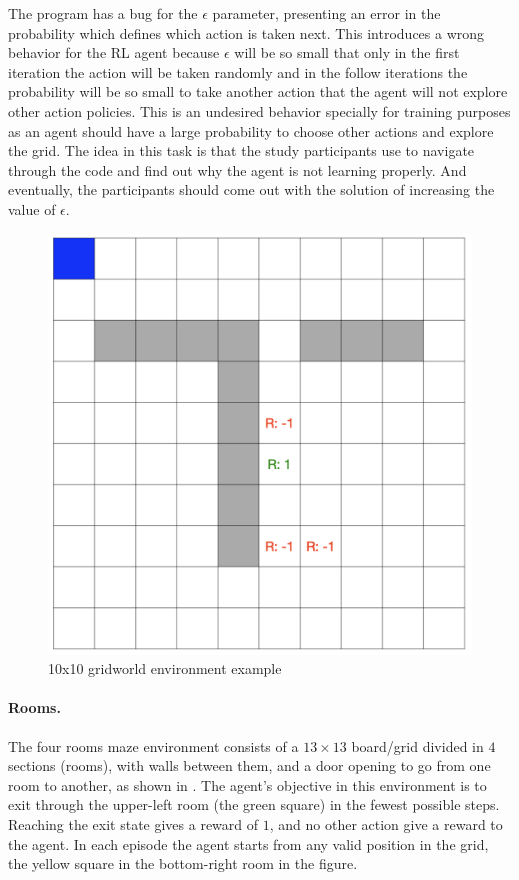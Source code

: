 The program has a bug for the $\epsilon$ parameter, presenting an error in the probability which defines which action is taken next. This introduces a wrong behavior for the \ac{RL} 
agent because $\epsilon$ will be so small that only in the first iteration the action will be taken randomly and in the follow iterations the probability will be so small to take another action that the agent will not explore other action policies. This is an undesired behavior specially for training purposes as an agent should have a large probability to choose other actions and explore the grid. The idea in this task is that the study participants use \flik to navigate through the code and find out why the agent is not learning properly. And eventually, the participants should come out with the solution of increasing the value of $\epsilon$. 

\begin{figure}[hptb]
  \centering
  \includegraphics[width=0.5\columnwidth]{figures/gridworld.png}
  \caption{10x10 gridworld environment example}
  \label{fig:gridworld}
\end{figure}

\paragraph{\textbf{Rooms.}} 
The four rooms maze environment consists of a $13\times 13$ board/grid divided in $4$ sections 
(\ie rooms), with walls between them, and a door opening to go from one room to another, as shown 
in . The agent's objective in this environment is to exit through the upper-left room 
(the green square) in the fewest possible steps. Reaching the exit state gives a reward of $1$, and no 
other action give a reward to the agent. In each episode the agent starts from any valid position in the 
grid, \eg the yellow square in the bottom-right room in the figure. 

